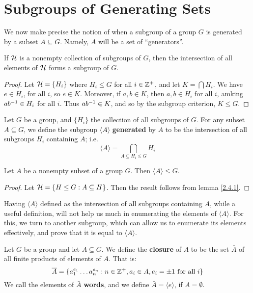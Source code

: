 \section{Subgroups of Generating Sets}
\label{section_2.4}

We now make precise the notion of when a subgroup of a group $G$ is generated by
a subset $A \subseteq G$. Namely, $A$ will be a set of ``generators''.

\begin{lemma}\label{lemma_2.4.1}
  If $\mathcal{H}$ is a nonempty collection of subgroups of  $G$, then the
  intersection of all elements of $\mathcal{H}$ forms a subgroup of $G$.
\end{lemma}
\begin{proof}
  Let $\mathcal{H}=\{H_i\}$ where $H_i \leq G$ for all  $i \in \mathbb{Z}^+$, and let
  $K=\bigcap{H_i}$. We have $e \in H_i$, for all  $i$, so  $e \in K$.
  Moreover, if  $a,b \in K$, then  $a,b \in H_i$ for all $i$, amking
  $ab^{-1} \in H_i$ for all $i$. Thus  $ab^{-1} \in K$, and so by the
  subgroup criterion, $K \leq G$.
\end{proof}

\begin{definition}
  Let $G$ be a group, and  $\{H_i\}$ the collection of all subgroups of $G$.
  For any subset  $A \subseteq G$, we define the subgroup $\langle A
  \rangle$ \textbf{generated} by $A$ to be the intersection of all
  subgroups $H_i$ containing  $A$; i.e.
  \begin{equation}
    \langle A \rangle=\bigcap_{A \subseteq H_i \leq G}{H_i}
  \end{equation}
\end{definition}

\begin{lemma}\label{lemma_2.4.2}
  Let $A$ be a nonempty subset of a group  $G$. Then  $\langle A
  \rangle \leq G$.
\end{lemma}
\begin{proof}
  Let $\mathcal{H}=\{H \leq G : A \subseteq H\}$. Then the result follows from lemma
  \ref{2.4.1}.
\end{proof}

Having $\langle A \rangle$ defined as the intersection of all subgroups
containing $A$, while a useful definition, will not help us much in enumerating
the elements of $\langle A \rangle$. For this, we turn to another subgroup, which
can allow us to enumerate its elements effectively, and prove that it is equal
to $\langle A \rangle$.

\begin{definition}
  Let $G$ be a group and let  $A \subseteq G$. We define the  \textbf{closure}
  of $A$ to be the set $\bar{A}$ of all finite products of elements of $A$.
  That is:
  \begin{equation}
    \overline{A}=\{a_1^{e_1} \dots a_n^{e_n} : n \in \mathbb{Z}^+, a_i \in A, e_i=\pm1
    \text{ for all } i\}
  \end{equation}
  We call the elements of $\bar{A}$ \textbf{words}, and we define
  $\bar{A}=\langle e \rangle$, if $A=\emptyset$.
\end{definition}

